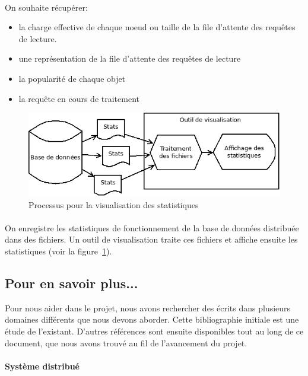 \documentclass[12pt]{article}
\begin{document}
\paragraph{} On souhaite récupérer:
\begin{itemize}
 \item la charge effective de chaque noeud ou taille de la file d'attente des requêtes de lecture.
 \item une représentation de la file d'attente des requêtes de lecture
 \item la popularité de chaque objet
 \item la requête en cours de traitement
\end{itemize}

\begin{figure}[h]
	\centering
		\includegraphics[width=12cm]{images/besoins/visu.png}
	\caption{Processus pour la visualisation des statistiques \label{fig:visu}}
\end{figure}

\paragraph{} On enregistre les statistiques de fonctionnement de la base de données distribuée dans des fichiers. Un outil de visualisation traite ces fichiers et affiche ensuite les statistiques (voir la figure~\ref{fig:visu}).

\newpage
\subsection{Pour en savoir plus...}
Pour nous aider dans le projet, nous avons rechercher des écrits dans plusieurs domaines différents que nous devons aborder. Cette bibliographie initiale est une étude de l'existant. D'autres références sont ensuite disponibles tout au long de ce document, que nous avons trouvé au fil de l'avancement du projet.

\paragraph{Système distribué}
\end{document}
